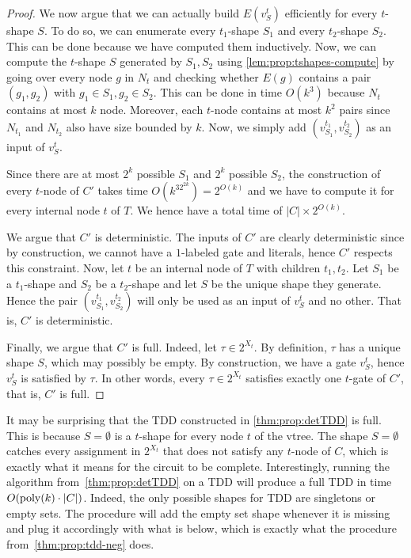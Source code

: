 \documentclass[a4paper,UKenglish,cleveref, autoref, thm-restate]{lipics-v2021}
\begin{document}
\begin{toappendix}
\begin{proof}
	We now argue that we can actually build $E(v_S^t)$ efficiently for every $t$-shape $S$. To do so, we can enumerate every $t_1$-shape $S_1$ and every $t_2$-shape $S_2$. This can be done because we have computed them inductively. Now, we can compute the $t$-shape  $S$ generated by $S_1,S_2$ using \cref{lem:prop:tshapes-compute} by going over every node $g$ in $N_t$ and checking whether $E(g)$ contains a pair $(g_1,g_2)$ with $g_1 \in S_1, g_2 \in S_2$. This can be done in time $O(k^3)$ because $N_t$ contains at most $k$ node. Moreover, each $t$-node contains at most $k^2$ pairs since $N_{t_1}$ and $N_{t_2}$ also have size bounded by $k$. Now, we simply add $(v_{S_1}^{t_1}, v_{S_2}^{t_2})$ as an input of $v_S^t$.
	
	Since there are at most $2^k$ possible $S_1$ and $2^k$ possible $S_2$, the construction of every $t$-node of $C'$ takes time $O(k^32^{2k}) = 2^{O(k)}$ and we have to compute it for every internal node $t$ of $T$. We hence have a total time of $|C| \times 2^{O(k)}$.
	
	We argue that $C'$ is deterministic. The inputs of $C'$ are clearly deterministic since by construction, we cannot have a $1$-labeled gate and literals, hence $C'$ respects this constraint. Now, let $t$ be an internal node of $T$ with children $t_1,t_2$. Let $S_1$ be a $t_1$-shape and $S_2$ be a $t_2$-shape and let $S$ be the unique shape they generate. Hence the pair $(v_{S_1}^{t_1}, v_{S_2}^{t_2})$ will only be used as an input of $v_S^t$ and no other. That is, $C'$ is deterministic.
	
	Finally, we argue that $C'$ is full. Indeed, let $\tau \in 2^{X_t}$. By definition, $\tau$ has a unique shape $S$, which may possibly be empty. By construction, we have a gate $v_S^t$, hence $v_S^t$ is satisfied by $\tau$. In other words, every $\tau \in 2^{X_t}$ satisfies exactly one $t$-gate of $C'$, that is, $C'$ is full. 
	
\end{proof}

It may be surprising that the TDD constructed in \cref{thm:prop:detTDD} is full. This is because $S=\emptyset$ is a $t$-shape for every node $t$ of the vtree. The shape $S=\emptyset$ catches every assignment in $2^{X_t}$ that does not satisfy any $t$-node of $C$, which is exactly what it means for the circuit to be complete. Interestingly, running the algorithm from~\cref{thm:prop:detTDD} on a TDD will produce a full TDD in time $O(\operatorname{poly}(k) \cdot |C|)$. Indeed, the only possible shapes for TDD are singletons or empty sets. The procedure will add the empty set shape whenever it is missing and plug it accordingly with what is below, which is exactly what the procedure from~\cref{thm:prop:tdd-neg} does. 
\end{toappendix}
\end{document}
